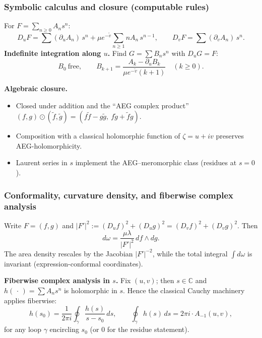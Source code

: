\documentclass[aspectratio=169]{beamer}
\begin{document}
\begin{frame}
  \frametitle{Symbolic calculus and closure (computable rules)}
  For $F=\sum_{n\ge0}A_n s^n$:
  \[
    D_u F=\sum (\partial_u A_n)\,s^n+\mu e^{-\tilde v}\sum_{n\ge1} nA_n\,s^{n-1},\qquad
    D_v F=\sum (\partial_v A_n)\,s^n.
  \]
  \textbf{Indefinite integration along $u$.} Find $G=\sum B_n s^n$ with $D_uG=F$:
  \[
    B_0\ \text{free},\qquad
    B_{k+1}=\frac{A_k-\partial_u B_k}{\mu e^{-\tilde v}(k+1)}\quad(k\ge0).
  \]

  \textbf{Algebraic closure.}
  \begin{itemize}
    \item Closed under addition and the “AEG complex product”
      $(f,g)\odot(\tilde f,\tilde g)=(f\tilde f-g\tilde g,\ f\tilde g+\tilde f g)$.
    \item Composition with a classical holomorphic function of $\zeta=u+iv$ preserves AEG-holomorphicity.
    \item Laurent series in $s$ implement the AEG–meromorphic class (residues at $s=0$).
  \end{itemize}
\end{frame}

\begin{frame}
  \frametitle{Conformality, curvature density, and fiberwise complex analysis}
  Write $F=(f,g)$ and $|F'|^2:=(D_uf)^2+(D_ug)^2=(D_vf)^2+(D_vg)^2$. Then
  \[
    d\omega=\frac{\mu\lambda}{|F'|^2}\,df\wedge dg. \tag{17}
  \]
  The area density rescales by the Jacobian $|F'|^{-2}$, while the total integral
  $\int d\omega$ is invariant (expression-conformal coordinates).

  \vspace{0.5em}
  \textbf{Fiberwise complex analysis in $s$.}
  Fix $(u,v)$; then $s\in\mathbb C$ and $h(\,\cdot\,)=\sum A_n s^n$ is holomorphic in $s$.
  Hence the classical Cauchy machinery applies fiberwise:
  \[
    h(s_0)=\frac{1}{2\pi i}\oint_{\gamma}\frac{h(s)}{s-s_0}\,ds,\qquad
    \oint_{\gamma} h(s)\,ds=2\pi i\cdot A_{-1}(u,v),
  \]
  for any loop $\gamma$ encircling $s_0$ (or $0$ for the residue statement).
\end{frame}
\end{document}
